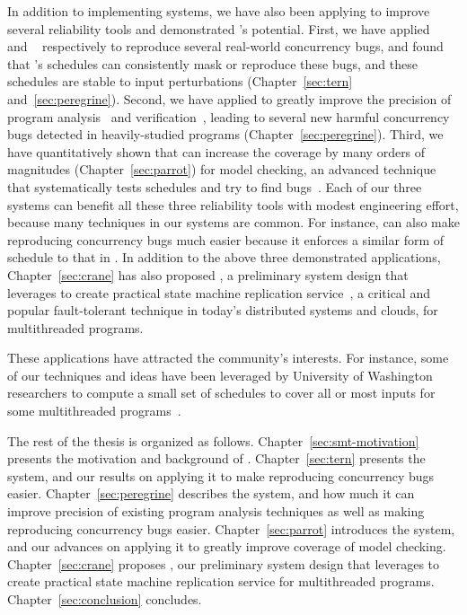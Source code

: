 In addition to implementing \smt systems, we have also been applying \smt to 
improve several reliability tools and demonstrated \smt's potential. First, 
we have applied \tern~\cite{cui:tern:osdi10} and 
\peregrine~\cite{peregrine:sosp11}
respectively to reproduce several real-world concurrency bugs, and found that
\smt's schedules can consistently mask or reproduce these bugs, and these
schedules are stable to input perturbations (Chapter~\ref{sec:tern} 
and~\ref{sec:peregrine}). Second, we have applied \peregrine to greatly improve 
the precision of program
analysis~\cite{wu:pldi12} and verification~\cite{wu:pldi12}, leading to several
new harmful concurrency bugs detected in heavily-studied programs 
(Chapter~\ref{sec:peregrine}). Third, we have quantitatively shown that \parrot 
can increase the coverage by many orders
of magnitudes (Chapter~\ref{sec:parrot}) for model checking, an advanced 
technique that systematically
tests schedules and try to find bugs~\cite{parrot:sosp13, dbug:spin11,
modist:nsdi09}. Each of our three \smt systems can benefit all these three
reliability tools with modest engineering effort, because many techniques
in our \smt systems are common. For instance, \parrot can also make
reproducing concurrency bugs much easier because it enforces a similar form
of schedule to that in \tern. In addition to the above three demonstrated \smt
applications, Chapter~\ref{sec:crane} has also proposed \crane, a preliminary
system design that leverages \smt to create practical state machine replication
service~\cite{paxos:practical}, a critical and popular fault-tolerant technique
in today's distributed systems and clouds, for multithreaded programs.

These \smt applications have attracted the community's interests. For instance,
some of our \smt techniques and ideas have been leveraged by University of
Washington researchers to compute a small set of schedules to cover all or most
inputs for some multithreaded programs~\cite{bergan:oopsla13}.

The rest of the thesis is organized as follows. Chapter~\ref{sec:smt-motivation}
presents the motivation and background of \smt. Chapter~\ref{sec:tern} presents
the \tern system, and our results on applying it to make reproducing concurrency
bugs easier. Chapter~\ref{sec:peregrine} describes the \peregrine system, and
how much it can improve precision of existing program analysis techniques as
well as making reproducing concurrency bugs easier. Chapter~\ref{sec:parrot}
introduces the \parrot system, and our advances on applying it to greatly
improve coverage of model checking. Chapter~\ref{sec:crane} proposes \crane, our
preliminary system design that leverages \smt to create practical
state machine replication service for multithreaded programs.
Chapter~\ref{sec:conclusion} concludes.



